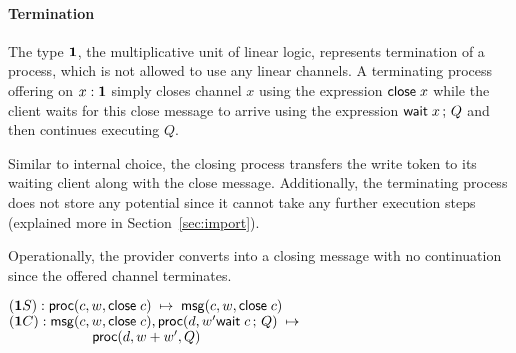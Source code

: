 \paragraph*{\textbf{Termination}}
The type $\mathbf{1}$, the multiplicative unit of linear logic, represents
termination of a process, which is not allowed to use
any linear channels. A terminating process offering on $x : \mathbf{1}$ simply
closes channel $x$ using the expression $\mathsf{close} \; x$ while the client waits
for this close message to arrive using the expression $\mathsf{wait} \; x \, ; \, Q$
and then continues executing $Q$.
Similar to internal choice, the closing process transfers the write
token to its waiting client along with the close message.
Additionally, the terminating process does not store
any potential since it cannot take any further execution steps
(explained more in Section~\ref{sec:import}).

Operationally, the provider converts into a closing message
with no continuation since the offered channel terminates.
\begin{tabbing}
$(\mathbf{1} S) : \mathsf{proc}(c, w, \mathsf{close} \; c) \; \mapsto \; \mathsf{msg}(c, w, \mathsf{close} \; c)$ \\
$(\mathbf{1} C) : \mathsf{msg}(c, w, \mathsf{close} \; c), \mathsf{proc}(d, w'\mathsf{wait} \; c \, ; \, Q) \; \mapsto \;$ \\
$ \qquad \qquad \qquad \mathsf{proc}(d, w+w', Q)$
\end{tabbing}



